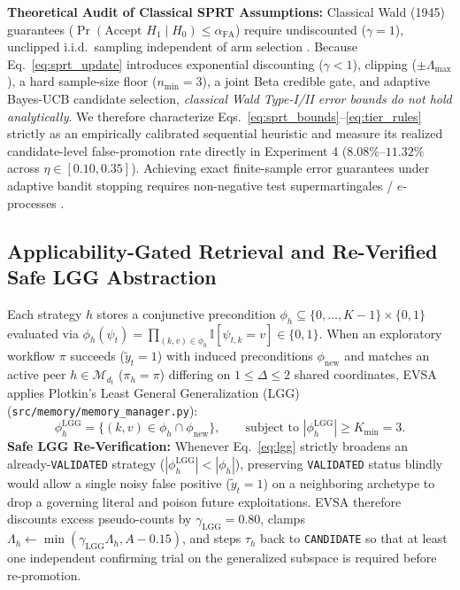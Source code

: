 \documentclass[10pt,letterpaper]{article}
\begin{document}
\textbf{Theoretical Audit of Classical SPRT Assumptions:} Classical Wald (1945) guarantees ($\Pr(\text{Accept } H_1 \mid H_0) \le \alpha_{\mathrm{FA}}$) require undiscounted ($\gamma=1$), unclipped i.i.d.\ sampling independent of arm selection \cite{wald1945sequential}. Because Eq.~\eqref{eq:sprt_update} introduces exponential discounting ($\gamma < 1$), clipping ($\pm \Lambda_{\max}$), a hard sample-size floor ($n_{\min}=3$), a joint Beta credible gate, and adaptive Bayes-UCB candidate selection, \emph{classical Wald Type-I/II error bounds do not hold analytically}. We therefore characterize Eqs.~\eqref{eq:sprt_bounds}--\eqref{eq:tier_rules} strictly as an empirically calibrated sequential heuristic and measure its realized candidate-level false-promotion rate directly in Experiment 4 ($8.08\%\text{--}11.32\%$ across $\eta \in [0.10, 0.35]$). Achieving exact finite-sample error guarantees under adaptive bandit stopping requires non-negative test supermartingales / $e$-processes \cite{ramdas2023game}.

\subsection{Applicability-Gated Retrieval and Re-Verified Safe LGG Abstraction}
Each strategy $h$ stores a conjunctive precondition $\phi_h \subseteq \{0,\dots,K-1\} \times \{0,1\}$ evaluated via $\phi_h(\psi_t) = \prod_{(k,v) \in \phi_h} \mathbb{I}[\psi_{t,k} = v] \in \{0,1\}$. When an exploratory workflow $\pi$ succeeds ($\tilde{y}_t = 1$) with induced preconditions $\phi_{\mathrm{new}}$ and matches an active peer $h \in \mathcal{M}_{d_t}$ ($\pi_h = \pi$) differing on $1 \le \Delta \le 2$ shared coordinates, EVSA applies Plotkin's Least General Generalization (LGG) \cite{plotkin1970inductive} (\texttt{src/memory/memory\_manager.py}):
\begin{equation}
  \phi_h^{\mathrm{LGG}} = \bigl\{(k, v) \in \phi_h \cap \phi_{\mathrm{new}}\bigr\}, \qquad \text{subject to } |\phi_h^{\mathrm{LGG}}| \ge K_{\min} = 3.
  \label{eq:lgg}
\end{equation}
\textbf{Safe LGG Re-Verification:} Whenever Eq.~\eqref{eq:lgg} strictly broadens an already-\texttt{VALIDATED} strategy ($|\phi_h^{\mathrm{LGG}}| < |\phi_h|$), preserving \texttt{VALIDATED} status blindly would allow a single noisy false positive ($\tilde{y}_t = 1$) on a neighboring archetype to drop a governing literal and poison future exploitations. EVSA therefore discounts excess pseudo-counts by $\gamma_{\mathrm{LGG}} = 0.80$, clamps $\Lambda_h \leftarrow \min(\gamma_{\mathrm{LGG}}\Lambda_h, A - 0.15)$, and steps $\tau_h$ back to \texttt{CANDIDATE} so that at least one independent confirming trial on the generalized subspace is required before re-promotion.
\end{document}
